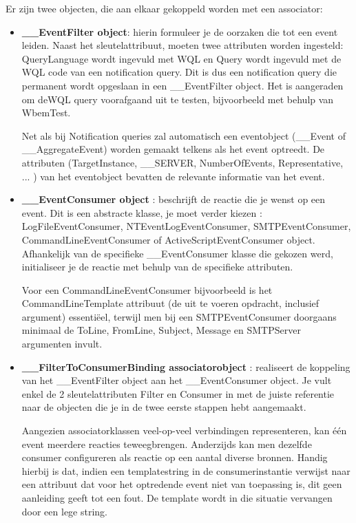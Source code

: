 \documentclass[11pt,a4paper]{report}
\begin{document}
Er zijn twee objecten, die aan elkaar gekoppeld worden met een associator:
\begin{itemize}
	
	\item \textbf{\_\_EventFilter object}: hierin formuleer je de oorzaken die tot een event leiden. Naast het sleutelattribuut, moeten twee attributen worden ingesteld: QueryLanguage wordt ingevuld met WQL en Query wordt ingevuld met de WQL code van een notification query. Dit is dus een notification query die permanent wordt opgeslaan in een \_\_EventFilter object. Het is aangeraden om deWQL query voorafgaand uit te testen, bijvoorbeeld met behulp van WbemTest.
	\par Net als bij Notification queries zal automatisch een eventobject (\_\_Event of \_\_AggregateEvent) worden gemaakt telkens als het event optreedt. De attributen (TargetInstance, \_\_SERVER, NumberOfEvents, Representative, ... ) van het eventobject bevatten de relevante informatie van het event.
	\item \textbf{\_\_EventConsumer object} : beschrijft de reactie die je wenst op een event. Dit is een abstracte klasse, je moet verder kiezen : LogFileEventConsumer, NTEventLogEventConsumer, SMTPEventConsumer, CommandLineEventConsumer of ActiveScriptEventConsumer object. Afhankelijk van de specifieke \_\_EventConsumer klasse die gekozen werd, initialiseer je de reactie met behulp van de specifieke attributen. 
	\par Voor een CommandLineEventConsumer bijvoorbeeld is het CommandLineTemplate attribuut (de uit te voeren opdracht, inclusief argument) essentiëel, terwijl men bij een SMTPEventConsumer doorgaans minimaal de ToLine, FromLine, Subject, Message en SMTPServer argumenten invult.
	\item \textbf{\_\_FilterToConsumerBinding associatorobject} : realiseert de koppeling van het \_\_EventFilter object aan het \_\_EventConsumer object. Je vult enkel de 2 sleutelattributen Filter en Consumer in met de juiste referentie naar de objecten die je in de twee eerste stappen hebt aangemaakt. 
	\par Aangezien associatorklassen veel-op-veel verbindingen representeren, kan één event meerdere reacties teweegbrengen. Anderzijds kan men dezelfde consumer configureren als reactie op een aantal diverse bronnen. Handig hierbij is dat, indien een templatestring in de consumerinstantie verwijst naar een attribuut dat voor het optredende event niet van toepassing is, dit geen aanleiding geeft tot een fout. De template wordt in die situatie vervangen door een lege string.
\end{itemize}
\end{document}
